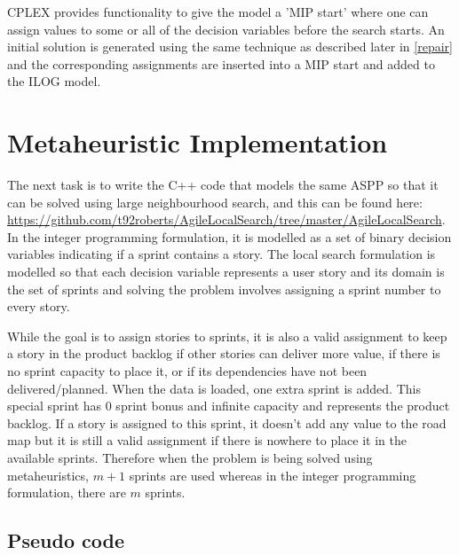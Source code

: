 CPLEX provides functionality to give the model a 'MIP start' where one can assign values to some or all of the decision variables before the search starts. An initial solution is generated using the same technique as described later in \cref{repair} and the corresponding assignments are inserted into a MIP start and added to the ILOG model.

\section{Metaheuristic Implementation}

The next task is to write the C++ code that models the same ASPP so that it can be solved using large neighbourhood search, and this can be found here: \url{https://github.com/t92roberts/AgileLocalSearch/tree/master/AgileLocalSearch}. In the integer programming formulation, it is modelled as a set of binary decision variables indicating if a sprint contains a story. The local search formulation is modelled so that each decision variable represents a user story and its domain is the set of sprints and solving the problem involves assigning a sprint number to every story.

While the goal is to assign stories to sprints, it is also a valid assignment to keep a story in the product backlog if other stories can deliver more value, if there is no sprint capacity to place it, or if its dependencies have not been delivered/planned. When the data is loaded, one extra sprint is added. This special sprint has 0 sprint bonus and infinite capacity and represents the product backlog. If a story is assigned to this sprint, it doesn't add any value to the road map but it is still a valid assignment if there is nowhere to place it in the available sprints. Therefore when the problem is being solved using metaheuristics, $m + 1$ sprints are used whereas in the integer programming formulation, there are $m$ sprints.

\subsection{Pseudo code}

